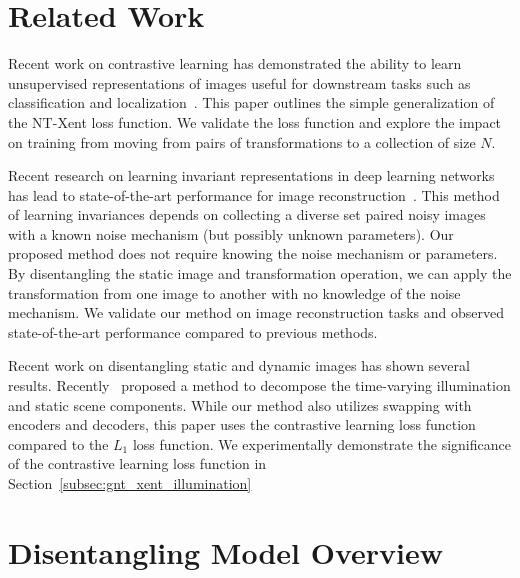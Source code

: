 \documentclass[11pt]{article}
\begin{document}
\section{Related Work}


Recent work on contrastive learning has demonstrated the ability to learn unsupervised representations of images useful for downstream tasks such as classification and localization~\cite{chen2020simple}. This paper outlines the simple generalization of the NT-Xent loss function. We validate the loss function and explore the impact on training from moving from pairs of transformations to a collection of size $N$. 

Recent research on learning invariant representations in deep learning networks has lead to state-of-the-art performance for image reconstruction~\cite{xia2019training}. This method of learning invariances depends on collecting a diverse set paired noisy images with a known noise mechanism (but possibly unknown parameters). Our proposed method does not require knowing the noise mechanism or parameters. By disentangling the static image and transformation operation, we can apply the transformation from one image to another with no knowledge of the noise mechanism. 
We validate our method on image reconstruction tasks and observed state-of-the-art performance compared to previous methods.


Recent work on disentangling static and dynamic images has shown several results. Recently~\cite{liu2020learning} proposed a method to decompose the time-varying illumination and static scene components. While our method also utilizes swapping with encoders and decoders, this paper uses the contrastive learning loss function compared to the $L_1$ loss function. We experimentally demonstrate the significance of the contrastive learning loss function in Section~\ref{subsec:gnt_xent_illumination}


\section{Disentangling Model Overview}
\end{document}
